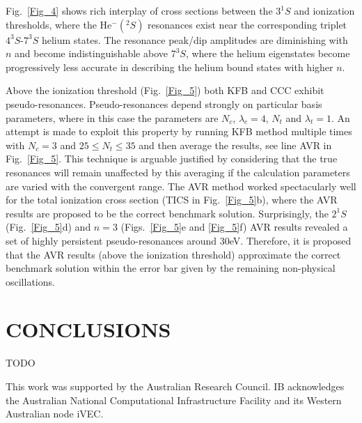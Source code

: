 \documentclass[aip
, pra
, showpacs
, aps
, twocolumn
, groupedaddress
, floatfix
]{revtex4}
\begin{document}
Fig.~\ref{Fig_4} shows  rich interplay of cross sections between the $3^1S$ and ionization thresholds,
where the He$^-(^2S)$ resonances exist near the corresponding triplet $4^3S$-$7^3S$ helium states.
The resonance peak/dip amplitudes are diminishing with $n$ and become indistinguishable above $7^3S$,
where the helium eigenstates become progressively less accurate in describing the helium bound states with higher $n$.


Above the ionization threshold (Fig.~\ref{Fig_5}) both KFB and CCC exhibit pseudo-resonances.
Pseudo-resonances depend strongly on particular basis parameters, where in this case the parameters are $N_c$, $\lambda_c=4$, $N_t$ and $\lambda_t=1$.
An attempt is made to exploit this property by running KFB method multiple times with $N_c=3$ and $25 \leq N_t\leq 35$ and then average the results, see line AVR in Fig.~\ref{Fig_5}.
This technique is arguable justified by considering that the true resonances will remain unaffected by this averaging if the calculation parameters are varied with the convergent range.
The AVR method worked spectacularly well for the total ionization cross section (TICS in Fig.~\ref{Fig_5}b), where the AVR results are proposed to be the correct benchmark solution.
Surprisingly, the $2^1S$ (Fig.~\ref{Fig_5}d) and $n=3$ (Figs.~\ref{Fig_5}e and \ref{Fig_5}f) AVR results revealed a set of highly persistent pseudo-resonances around 30eV.
Therefore, it is proposed that the AVR results (above the ionization threshold) approximate the correct benchmark solution within the error bar given by the remaining non-physical oscillations.

\section{CONCLUSIONS}


TODO



\begin{acknowledgments}
This work was supported by the Australian Research Council. IB
acknowledges the Australian National Computational Infrastructure
Facility and its Western Australian node iVEC.
\end{acknowledgments}





\end{document}
